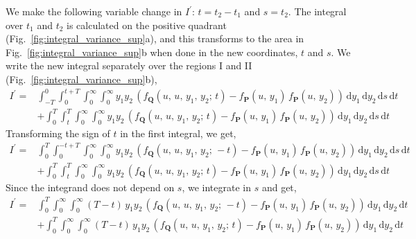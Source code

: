 \documentclass[journal]{IEEEtran}
\theoremstyle{plain}
\theoremstyle{definition}
\theoremstyle{remark}
\newcommand{\dd}{\mathrm{d}}
\begin{document}
We make the following variable change in $I^\prime$: $t=t_2-t_1$ and $s = t_2$. The integral over $t_1$ and $t_2$ is calculated on the positive quadrant (Fig.~\ref{fig:integral_variance_sup}a), and this transforms to the area in Fig.~\ref{fig:integral_variance_sup}b when done in the new coordinates, $t$ and $s$. We write the new integral separately over the regions I and II (Fig.~\ref{fig:integral_variance_sup}b),
\begin{equation}
\begin{split}
    I^\prime =& \int_{-T}^0 \int_0^{t+T} \int_{0}^\infty \int_{0}^\infty y_1 y_2 \,\left( f_{\mathbf{Q}}(u, \,u, \,y_1, \,y_2; \, t) - f_{\mathbf{P}}(u,\,y_1) \, f_{\mathbf{P}}(u,\,y_2)\right)\, \dd y_1 \, \dd y_2 \, \dd s \, \dd t \\
    &+ \int_{0}^T \int_t^{T} \int_{0}^\infty \int_{0}^\infty y_1 y_2 \,\left( f_{\mathbf{Q}}(u, \,u, \,y_1, \,y_2; \, t) - f_{\mathbf{P}}(u,\,y_1) \, f_{\mathbf{P}}(u,\,y_2)\right)\, \dd y_1 \, \dd y_2 \, \dd s \, \dd t
\end{split}
\end{equation}
Transforming the sign of $t$ in the first integral, we get,
\begin{equation}
\begin{split}
    I^\prime =& \int_{0}^T \int_0^{-t+T} \int_{0}^\infty \int_{0}^\infty y_1 y_2 \,\left( f_{\mathbf{Q}}(u, \,u, \,y_1, \,y_2; \, -t) - f_{\mathbf{P}}(u,\,y_1) \, f_{\mathbf{P}}(u,\,y_2)\right)\, \dd y_1 \, \dd y_2 \, \dd s \, \dd t \\
    &+ \int_{0}^T \int_t^{T} \int_{0}^\infty \int_{0}^\infty y_1 y_2 \,\left( f_{\mathbf{Q}}(u, \,u, \,y_1, \,y_2; \, t) - f_{\mathbf{P}}(u,\,y_1) \, f_{\mathbf{P}}(u,\,y_2)\right)\, \dd y_1 \, \dd y_2 \, \dd s \, \dd t
\end{split}
\end{equation}
Since the integrand does not depend on $s$, we integrate in $s$ and get,
\begin{equation}
\begin{split}
    I^\prime =& \int_{0}^T \int_{0}^\infty \int_{0}^\infty (T-t) \,y_1 y_2 \,\left( f_{\mathbf{Q}}(u, \,u, \,y_1, \,y_2; \, -t) - f_{\mathbf{P}}(u,\,y_1) \, f_{\mathbf{P}}(u,\,y_2)\right)\, \dd y_1 \, \dd y_2 \, \dd t \\
    &+ \int_{0}^T \int_{0}^\infty \int_{0}^\infty (T-t) \, y_1 y_2 \,\left( f_{\mathbf{Q}}(u, \,u, \,y_1, \,y_2; \, t) - f_{\mathbf{P}}(u,\,y_1) \, f_{\mathbf{P}}(u,\,y_2)\right)\, \dd y_1 \, \dd y_2 \, \dd t 
\end{split} \label{eq:sign_minus_t1}
\end{equation}
\end{document}
